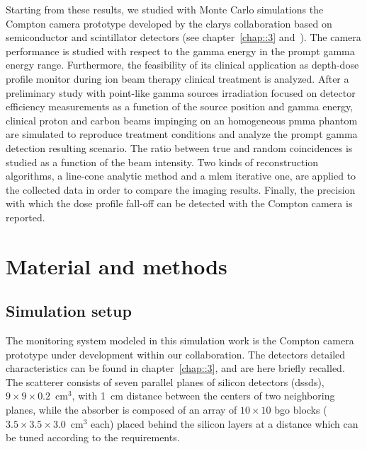 Starting from these results, we studied with Monte Carlo simulations the Compton camera prototype developed by the \gls{clarys} collaboration based on semiconductor and scintillator detectors (see chapter~\ref{chap::3} and~\cite{Krimmer2015, Fontana2018}).
The camera performance is studied with respect to the gamma energy in the prompt gamma energy range. Furthermore, the feasibility of its clinical application as depth-dose profile monitor during ion beam therapy clinical treatment is analyzed. After a preliminary study with point-like gamma sources irradiation focused on detector efficiency measurements as a function of the source position and gamma energy, clinical proton and carbon beams impinging on an homogeneous \gls{pmma} phantom are simulated to reproduce treatment conditions and analyze the prompt gamma detection resulting scenario. The ratio between true and random coincidences is studied as a function of the beam intensity. Two kinds of reconstruction algorithms, a line-cone analytic method and a \gls{mlem} iterative one, are applied to the collected data in order to compare the imaging results. Finally, the precision with which the dose profile fall-off can be detected with the Compton camera is reported.   


\section{Material and methods}\label{chap4::sec::MatMet}

\subsection{Simulation setup}\label{chap4::subsec::SimuSetup}

The monitoring system modeled in this simulation work is the Compton camera prototype under development within our collaboration. The detectors detailed characteristics can be found in chapter~\ref{chap::3}, and are here briefly recalled.\\
The scatterer consists of seven parallel planes of silicon detectors (\glspl{dssd}), $9\times9\times0.2$~cm$^3$, with 1~cm distance between the centers of two neighboring planes, while the absorber is composed of an array of $10\times10$ \gls{bgo} blocks ($3.5\times3.5\times3.0$~cm$^3$ each) placed behind the silicon layers at a distance which can be tuned according to the requirements.

